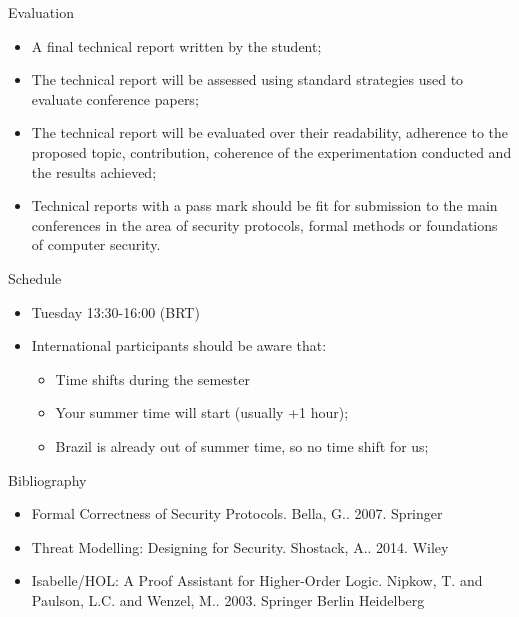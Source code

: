 \documentclass[12pt]{beamer}
\begin{document}
\begin{frame}{Evaluation}
\begin{itemize}
\item A final technical report written by the student;\pause
\item The technical report will be assessed using standard strategies used to evaluate conference papers;\pause
\item The technical report will be evaluated over their readability, adherence to the
proposed topic, contribution, coherence of the experimentation conducted and the results achieved;\pause
\item Technical reports with a pass mark should be fit for submission to the main conferences in the area of security protocols, formal methods or foundations of computer security.
\end{itemize}
\end{frame}

\begin{frame}{Schedule}
\begin{itemize}
\item Tuesday 13:30-16:00 (BRT)\pause
\item International participants should be aware that:
\begin{itemize}
\item Time shifts during the semester
\item Your summer time will start (usually +1 hour);
\item Brazil is already out of summer time, so no time shift for us;
\end{itemize}
\end{itemize}
\end{frame}

\begin{frame}{Bibliography}
\begin{itemize}
\item Formal Correctness of Security Protocols. Bella, G.. 2007. Springer
\item Threat Modelling: Designing for Security. Shostack, A.. 2014. Wiley
\item Isabelle/HOL: A Proof Assistant for Higher-Order Logic. Nipkow, T. and Paulson, L.C. and Wenzel, M.. 2003. Springer Berlin Heidelberg
\end{itemize}
\end{frame}
\end{document}
